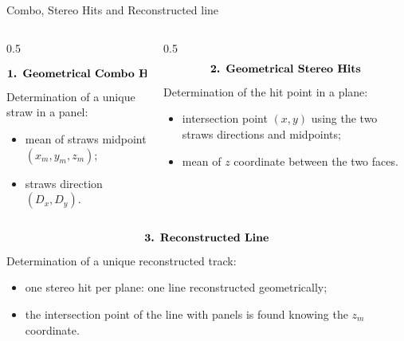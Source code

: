 \documentclass{beamer}[10pt]
\begin{document}
  \begin{frame}{Combo, Stereo Hits and Reconstructed line}
    \vspace{-3mm}
\begin{columns}
  \begin{column}{0.5\framewidth}
    \vspace{-15mm}

    $$\textbf{\text{1. Geometrical Combo Hits}}$$
    Determination of a unique straw in a panel:
    \begin{itemize}
      \item mean of straws midpoint $(x_m,y_m,z_m)$;
      \item straws direction $(D_x,D_y)$.
    \end{itemize}
  \end{column}
  \begin{column}{0.5\framewidth}
    $$\textbf{\text{2. Geometrical Stereo Hits}}$$
    Determination of the hit point in a plane:
    \begin{itemize}
      \item intersection point $(x,y)$ using the two straws directions and midpoints;
      \item mean of $z$ coordinate between the two faces.
    \end{itemize}
  \end{column}
\end{columns}
\vspace{5mm}

$$\textbf{\text{3. Reconstructed Line}}$$
Determination of a unique reconstructed track:
\begin{itemize}
  \item one stereo hit per plane: one line reconstructed geometrically;
  \item the intersection point of the line with panels is found knowing the $z_m$ coordinate. 
\end{itemize}

  \end{frame}
\end{document}
